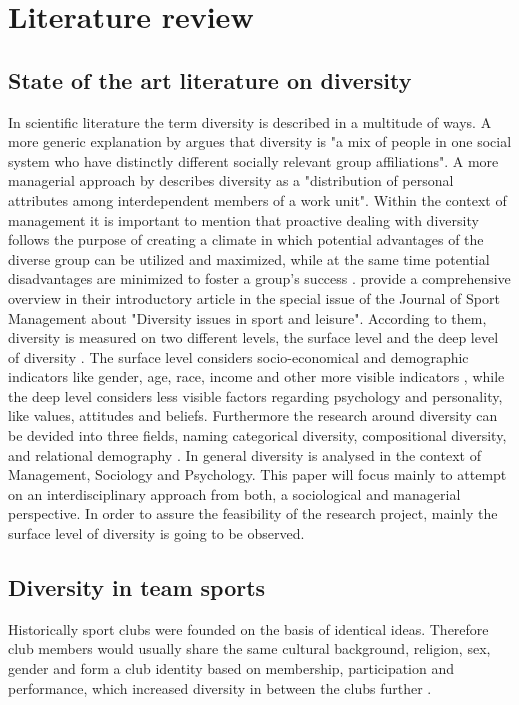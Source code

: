 \documentclass[	
	12pt, %
	a4paper, %
]{scrartcl}\usepackage[]{graphicx}\usepackage[]{color}
\begin{document}
\section{Literature review}
\label{sec:literature}

\subsection{State of the art literature on diversity}

In scientific literature the term diversity is described in a multitude of ways. A more generic explanation by  argues that diversity is "a mix of people in one social system who have distinctly different socially relevant group affiliations". A more managerial approach by  describes diversity as a "distribution of personal attributes among interdependent members of a work unit". Within the context of management it is important to mention that proactive dealing with diversity follows the purpose of creating a climate in which potential advantages of the diverse group can be utilized and maximized, while at the same time potential disadvantages are minimized to foster a group's success \cite{Cox1997}.  provide a comprehensive overview in their introductory article in the special issue of the Journal of Sport Management about "Diversity issues in sport and leisure". According to them, diversity is measured on two different levels, the surface level and the deep level of diversity \cite{Cunningham2006}. The surface level considers socio-economical and demographic indicators like gender, age, race, income and other more visible indicators \cite{Fink2001, Siciliano1996}, while the deep level considers less visible factors regarding psychology and personality, like values, attitudes and beliefs.
Furthermore the research around diversity can be devided into three fields, naming categorical diversity, compositional diversity, and relational demography \cite{Cunningham2006, Tsui1999}.
In general diversity is analysed in the context of Management, Sociology and Psychology. This paper will focus mainly to attempt on an interdisciplinary approach from both, a sociological and managerial perspective. In order to assure the feasibility of the research project, mainly the surface level of diversity is going to be observed.

\subsection{Diversity in team sports}
Historically sport clubs were founded on the basis of identical ideas. Therefore club members would usually share the same cultural background, religion, sex, gender and form a club identity based on membership, participation and performance, which increased diversity in between the clubs further \cite{Anthonissen2001, Day1981}.
\end{document}
